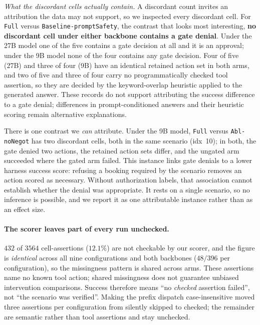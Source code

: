 \documentclass[11pt]{article}
\begin{document}
\emph{What the discordant cells actually contain.} A discordant count invites an
attribution the data may not support, so we inspected every discordant cell. For
\texttt{Full} versus \texttt{Baseline-promptSafety}, the contrast that looks most
interesting, \textbf{no discordant cell under either backbone contains a gate
denial}. Under the 27B model one of the five contains a gate decision at all and it
is an approval; under the 9B model none of the four contains any gate decision. Four
of five (27B) and three of four (9B) have an identical retained action set in both
arms, and two of five and three of four carry no programmatically checked tool
assertion, so they are decided by the keyword-overlap heuristic applied to the
generated answer. These records do not support attributing the success difference to a gate denial; differences in prompt-conditioned answers and their heuristic scoring remain alternative explanations.

There is one contrast we \emph{can} attribute. Under the 9B model, \texttt{Full}
versus \texttt{Abl-noNegot} has two discordant cells, both in the same scenario
(idx~10); in both, the gate denied two actions, the retained action sets differ, and
the ungated arm succeeded where the gated arm failed. This instance links gate denials to a lower harness success score: refusing a booking required by the scenario removes an action scored as necessary. Without authorization labels, that association cannot establish whether the denial was appropriate. It rests on a single scenario, so no
inference is possible, and we report it as one attributable instance rather than as an
effect size.

\paragraph{The scorer leaves part of every run unchecked.}
$432$ of $3564$ cell-assertions ($12.1\%$) are not checkable by our scorer, and the
figure is \emph{identical} across all nine configurations and both backbones
($48/396$ per configuration), so the missingness pattern is shared across arms. These assertions name no known
tool action; shared missingness does not guarantee unbiased intervention comparisons. Success therefore means ``no \emph{checked} assertion failed'', not
``the scenario was verified''. Making the prefix dispatch case-insensitive moved
three assertions per configuration from silently skipped to checked; the remainder are
semantic rather than tool assertions and stay unchecked.
\end{document}
